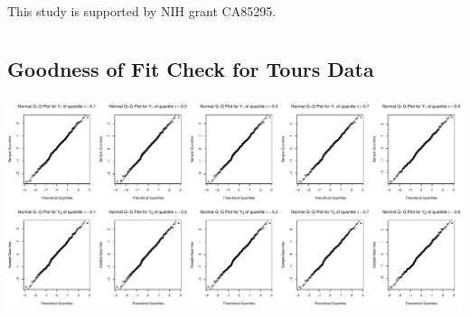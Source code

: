 \documentclass[useAMS,usenatbib,referee]{biom}
\begin{document}
This study is supported by NIH grant CA85295.






\appendix
\section{}

\subsection{Goodness of Fit Check for Tours Data}
\label{sec:goftours}

\centerline{\includegraphics[scale = .4 ]{../image/ToursGoF}}

\label{lastpage}
\end{document}
